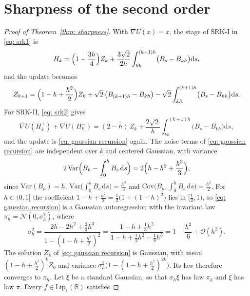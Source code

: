 \documentclass[namedate,webpdf,imanum]{ima-authoring-template}
\newcommand{\D}{\mathrm{d}}
\newcommand{\Var}{\mathrm{Var}}
\theoremstyle{thmstyletwo}
\numberwithin{equation}{section}
\begin{document}
\section{Sharpness of the second order}
\label{sec: sharpness}

\begin{proof}[Proof of Theorem~\ref{thm: sharpness}]
    With $\nabla U(x) = x$, the stage of SRK-I in \eqref{eq: srk1} is
    \begin{equation*}
        H_k = \Bigl( 1 - \frac{3h}{4} \Bigr) Z_k + \frac{3\sqrt2}{2h} \int_{kh}^{(k+1)h} \bigl( B_s - B_{kh} \bigr) \D s ,
    \end{equation*}
    and the update becomes
    \begin{equation}
        Z_{k+1} = \Bigl( 1 - h + \frac{h^2}{2} \Bigr) Z_k + \sqrt2\, \bigl( B_{(k+1)h} - B_{kh} \bigr) - \sqrt2 \int_{kh}^{(k+1)h} \bigl( B_s - B_{kh} \bigr) \D s .
        \label{eq: gaussian recursion}
    \end{equation}
    For SRK-II, \eqref{eq: srk2} gives
    \begin{equation*}
        \nabla U(H_k^{+}) + \nabla U(H_k^{-}) = ( 2 - h )\, Z_k + \frac{2\sqrt2}{h} \int_{kh}^{(k+1)h} \bigl( B_s - B_{kh} \bigr) \D s ,
    \end{equation*}
    and the update is \eqref{eq: gaussian recursion} again. The noise terms of \eqref{eq: gaussian recursion} are independent over $k$ and centered Gaussian, with variance
    \begin{equation*}
        2\, \Var\Bigl( B_h - \int_0^h B_s\,\D s \Bigr) = 2 \Bigl( h - h^2 + \frac{h^3}{3} \Bigr) ,
    \end{equation*}
    since $\Var(B_h) = h$, $\Var\bigl( \int_0^h B_s\,\D s \bigr) = \frac{h^3}{3}$ and $\mathrm{Cov}\bigl( B_h, \int_0^h B_s\,\D s \bigr) = \frac{h^2}{2}$. For $h \in (0,1]$ the coefficient $1 - h + \frac{h^2}{2} = \frac12 \bigl( 1 + ( 1 - h )^2 \bigr)$ lies in $[\frac12, 1)$, so \eqref{eq: gaussian recursion} is a Gaussian autoregression with the invariant law $\pi_h = \mathcal N(0, \sigma_h^2)$, where
    \begin{equation}
        \sigma_h^2 = \frac{2 h - 2 h^2 + \frac23 h^3}{1 - ( 1 - h + \frac{h^2}{2} )^2}
        = \frac{1 - h + \frac13 h^2}{1 - h + \frac12 h^2 - \frac18 h^3}
        = 1 - \frac{h^2}{6} + \mathcal O(h^3) .
        \label{eq: invariant variance}
    \end{equation}
    The solution $Z_k$ of \eqref{eq: gaussian recursion} is Gaussian, with mean $( 1 - h + \frac{h^2}{2} )^k Z_0$ and variance $\sigma_h^2 \bigl( 1 - ( 1 - h + \frac{h^2}{2} )^{2k} \bigr)$. Its law therefore converges to $\pi_h$. Let $\xi$ be a standard Gaussian, so that $\sigma_h \xi$ has law $\pi_h$ and $\xi$ has law $\pi$. Every $f \in \mathrm{Lip}_1(\mathbb R)$ satisfies

\end{proof}
\end{document}
